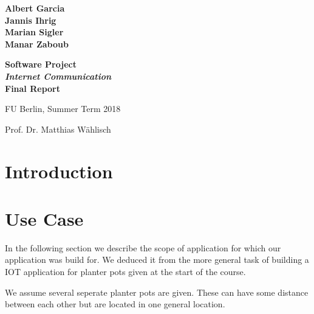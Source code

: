 \documentclass[11pt,paper=a4,parskip=half]{scrartcl}
\begin{document}
\thispagestyle{empty}


\begin{center}

\begin{spacing}{1.2}
\textbf{ \LARGE
Albert Garcia \\
Jannis Ihrig \\
Marian Sigler \\
Manar Zaboub \\
}

\end{spacing}\vspace{2.5em}


\textbf{ \Huge Software Project \\ \emph{Internet Communication} \\\vspace{0.8em}
Final Report}
\vspace{2.5em}

\begin{spacing}{1}
\Large

FU Berlin, Summer Term 2018

Prof. Dr. Matthias Wählisch
\end{spacing}
\end{center}

\vspace{10mm}


\setcounter{tocdepth}{2}
\tableofcontents

\newpage



\section{Introduction}






\section{Use Case}
\label{sec:usecase}

  In the following section we describe the scope of application for which our
  application was build for. We deduced it from the more general task of
  building a IOT application for planter pots given at the start of the course.

  We assume several seperate planter pots are given. These can have some
  distance between each other but are located in one general location.
\end{document}
